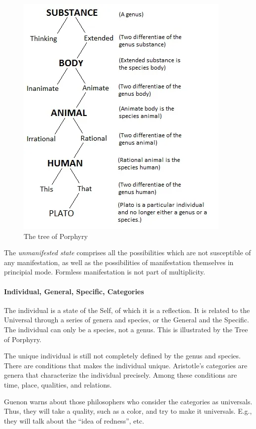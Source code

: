 \begin{figure}
\centering
\includegraphics[scale=0.5]{a20220922SacredScience102TheSelfandtheEgo-img002.png}
\caption{The tree of Porphyry}
\end{figure}

The \textit{unmanifested state} comprises all the possibilities which are not susceptible of any manifestation, as well as the possibilities of manifestation themselves in principial mode. Formless manifestation is not part of multiplicity.

\paragraph{Individual, General, Specific, Categories}

The individual is a state of the Self, of which it is a reflection. It is related to the Universal through a series of genera and species, or the General and the Specific. The individual can only be a species, not a genus. This is illustrated by the Tree of Porphyry.

The unique individual is still not completely defined by the genus and species. There are conditions that makes the individual unique. Aristotle’s categories are genera that characterize the individual precisely. Among these conditions are time, place, qualities, and relations.

Guenon warns about those philosophers who consider the categories as universals. Thus, they will take a quality, such as a color, and try to make it universals. E.g., they will talk about the “idea of redness”, etc.

